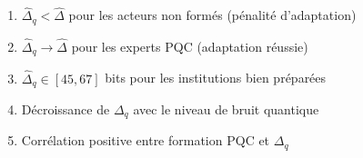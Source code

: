 \begin{sloppypar}
\begin{enumerate}
\item $\hat\Delta_q < \hat\Delta$ pour les acteurs non form\'es (p\'enalit\'e d'adaptation)
\item $\hat\Delta_q \to \hat\Delta$ pour les experts PQC (adaptation r\'eussie)
\item $\hat\Delta_q \in [45, 67]$ bits pour les institutions bien pr\'epar\'ees
\item D\'ecroissance de $\Delta_q$ avec le niveau de bruit quantique
\item Corr\'elation positive entre formation PQC et $\Delta_q$
\end{enumerate}
\end{sloppypar}

